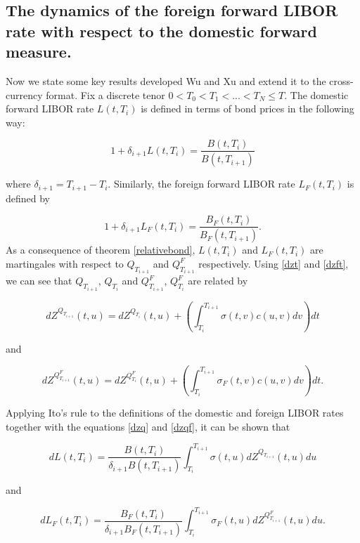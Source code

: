 \documentclass[11pt]{article}
\begin{document}
\subsection{The dynamics of the foreign forward LIBOR rate with respect to the domestic forward measure.}

Now we state some key results developed Wu and Xu \cite{wu}
and extend it to the cross-currency format. Fix a discrete tenor $0< T_0<T_1<...<T_N\leq T.$ The domestic forward LIBOR rate $L(t,T_i)$ is defined in terms of bond prices in the following way:

\begin{equation*}
    1+\delta_{i+1}L(t,T_i)=\frac{B(t,T_{i})}{B(t,T_{i+1})}
\end{equation*}

where $\delta_{i+1}=T_{i+1}-T_i.$
Similarly, the foreign forward LIBOR rate $L_F(t,T_i)$ is defined by 

\begin{equation*}
    1+\delta_{i+1}L_F(t,T_i)=\frac{B_F(t,T_{i})}{B_F(t,T_{i+1})}.
\end{equation*}
As a consequence of theorem \eqref{relativebond}, $L(t,T_i)$ and $L_F(t,T_i)$ are martingales with respect to $Q_{T_{i+1}}$ and $Q^F_{T_{i+1}}$ respectively. 
Using \eqref{dzt} and \eqref{dzft}, we can see that $Q_{T_{i+1}}$, $Q_{T_i}$  and $Q^F_{T_{i+1}}$, $Q^F_{T_i}$ are related by

\begin{equation}\label{dzq}
    dZ^{Q_{T_{i+1}}}(t,u)=dZ^{Q_{T_i}}(t,u)+\left(\int_{T_i}^{T_{i+1}}\sigma(t,v)c(u,v)dv\right)dt
\end{equation}

and

\begin{equation}\label{dzqf}
    dZ^{Q^F_{T_{i+1}}}(t,u)=dZ^{Q^F_{T_i}}(t,u)+\left(\int_{T_i}^{T_{i+1}}\sigma_F(t,v)c(u,v)dv\right)dt.
\end{equation}

Applying Ito's rule to the definitions of the domestic and foreign LIBOR rates together with the equations \eqref{dzq} and \eqref{dzqf}, it can be shown that

\begin{equation}
    dL(t,T_i)=\frac{B(t,T_{i})}{\delta_{i+1} B(t,T_{i+1})}\int_{T_i}^{T_{i+1}}\sigma(t,u)dZ^{Q_{T_{i+1}}}(t,u)du
\end{equation}

and 

\begin{equation}
    dL_F(t,T_i)=\frac{B_F(t,T_{i})}{\delta_{i+1} B_F(t,T_{i+1})}\int_{T_i}^{T_{i+1}}\sigma_F(t,u)dZ^{Q^F_{T_{i+1}}}(t,u)du.
\end{equation}
\end{document}
